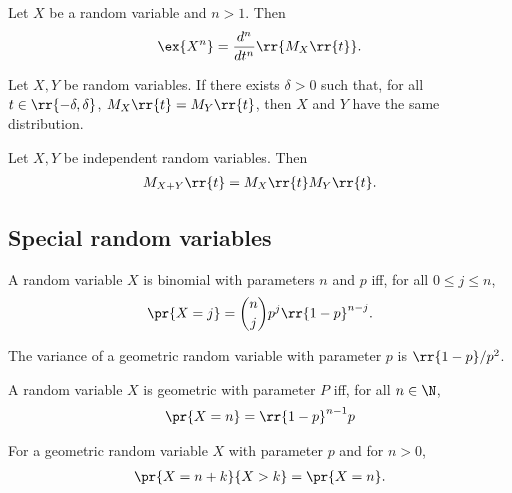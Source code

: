 \documentclass{article}
\begin{document}
\begin{theorem}
  Let $X$ be a random variable and $n>1$. Then
  \begin{align*}
    \ex{X^n}=\frac{d^n}{dt^n}\rr{M_X\rr{t}}.
  \end{align*}
\end{theorem}

\begin{theorem}
  Let $X,Y$ be random variables. If there exists $\delta>0$ such that, for all $t\in\rr{-\delta,\delta}$,
  $M_X\rr{t}=M_Y\rr{t}$, then $X$ and $Y$ have the same distribution.
\end{theorem}

\begin{theorem}
  Let $X,Y$ be independent random variables. Then
  \begin{align*}
    M_{X+Y}\rr{t}=M_X\rr{t}M_Y\rr{t}.
  \end{align*}
\end{theorem}

\subsection{Special random variables}

\begin{definition}
  \label{def:binomial}
  A random variable $X$ is binomial with parameters $n$ and $p$ iff,
  for all $0\leq j\leq n$,
  \begin{align*}
    \pr{X=j}=\binom{n}{j}p^j \rr{1-p}^{n-j}.
  \end{align*}
\end{definition}

\begin{lemma}
  The variance of a geometric random variable with parameter $p$ is $\rr{1-p}/p^2$.
\end{lemma}

\begin{definition}
  \label{def:geometric}
  A random variable $X$ is geometric with parameter $P$ iff, for all $n\in\N$,
  \begin{align*}
    \pr{X=n}=\rr{1-p}^{n-1} p
  \end{align*}
\end{definition}

\begin{lemma}
  For a geometric random variable $X$ with parameter $p$ and for $n>0$,
  \begin{align*}
    \pr{X=n+k}{X>k} = \pr{X=n}.
  \end{align*}
\end{lemma}
\end{document}
